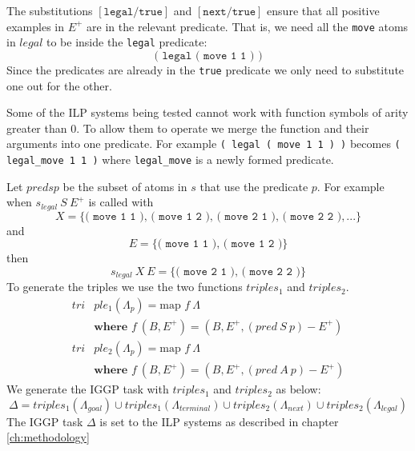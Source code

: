 The substitutions $[\texttt{legal}/\texttt{true}]$ and $[\texttt{next}/\texttt{true}]$ ensure that all positive examples in $E^+$ are in the relevant predicate. That is, we need all the \texttt{move} atoms in $legal$ to be inside the \texttt{legal} predicate:
\[\texttt{( legal ( move 1 1 ) )}\]
Since the predicates are already in the \texttt{true} predicate we only need to substitute one out for the other.

Some of the ILP systems being tested cannot work with function symbols of arity greater than 0. To allow them to operate we merge the function and their arguments into one predicate. For example \texttt{( legal ( move 1 1 ) )} becomes \verb|( legal_move 1 1 )| where \verb|legal_move| is a newly formed predicate.

Let $pred s p$ be the subset of atoms in $s$ that use the predicate $p$. For example when $s_{legal}\ S\ E^+$ is called with
\[X = \{\texttt{( move 1 1 ), ( move 1 2 ), ( move 2 1 ), ( move 2 2 )}, ...\}\]
and
\[E = \{ \texttt{( move 1 1 ), ( move 1 2 )}\}\]
then
\[s_{legal}\ X\ E = \{\texttt{( move 2 1 ), ( move 2 2 )}\}\]
To generate the triples we use the two functions $triples_1$ and $triples_2$.
\begin{align*}
tri&ple_1(\Lambda_p) = \text{map } f\ \Lambda \\
&\textbf{where } f\ (B,E^+) = (B,E^+,(pred\ S\ p) - E^+)\\
tri&ple_2(\Lambda_p) = \text{map } f\ \Lambda \\
&\textbf{where } f\ (B,E^+) = (B,E^+,(pred\ A\ p) - E^+)
\end{align*}
We generate the IGGP task with $triples_1$ and $triples_2$ as below:
\[\Delta = triples_1(\Lambda_{goal}) \cup triples_1(\Lambda_{terminal}) \cup triples_2(\Lambda_{next}) \cup triples_2(\Lambda_{legal})\]
The IGGP task $\Delta$ is set to the ILP systems as described in chapter \ref{ch:methodology}
